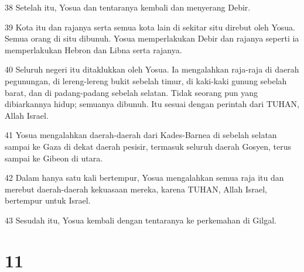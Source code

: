 \par 38 Setelah itu, Yosua dan tentaranya kembali dan menyerang Debir.
\par 39 Kota itu dan rajanya serta semua kota lain di sekitar situ direbut oleh Yosua. Semua orang di situ dibunuh. Yosua memperlakukan Debir dan rajanya seperti ia memperlakukan Hebron dan Libna serta rajanya.
\par 40 Seluruh negeri itu ditaklukkan oleh Yosua. Ia mengalahkan raja-raja di daerah pegunungan, di lereng-lereng bukit sebelah timur, di kaki-kaki gunung sebelah barat, dan di padang-padang sebelah selatan. Tidak seorang pun yang dibiarkannya hidup; semuanya dibunuh. Itu sesuai dengan perintah dari TUHAN, Allah Israel.
\par 41 Yosua mengalahkan daerah-daerah dari Kades-Barnea di sebelah selatan sampai ke Gaza di dekat daerah pesisir, termasuk seluruh daerah Gosyen, terus sampai ke Gibeon di utara.
\par 42 Dalam hanya satu kali bertempur, Yosua mengalahkan semua raja itu dan merebut daerah-daerah kekuasaan mereka, karena TUHAN, Allah Israel, bertempur untuk Israel.
\par 43 Sesudah itu, Yosua kembali dengan tentaranya ke perkemahan di Gilgal.

\chapter{11}

